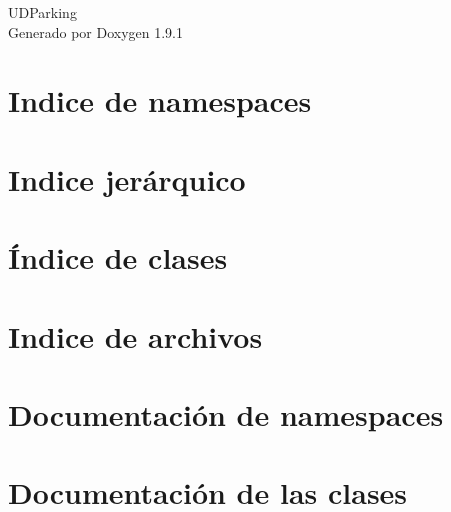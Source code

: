 \let\mypdfximage\pdfximage\def\pdfximage{\immediate\mypdfximage}\documentclass[twoside]{book}
\newcommand{\+}{\discretionary{\mbox{\scriptsize$\hookleftarrow$}}{}{}}
\newcommand{\clearemptydoublepage}{%
  \newpage{\pagestyle{empty}\cleardoublepage}%
}
\begin{document}
\raggedbottom

\begin{titlepage}
\vspace*{7cm}
\begin{center}%
{\Large UDParking }\\
\vspace*{1cm}
{\large Generado por Doxygen 1.9.1}\\
\end{center}
\end{titlepage}
\clearemptydoublepage
{}
\tableofcontents
\clearemptydoublepage
{}

\chapter{Indice de namespaces}

\chapter{Indice jerárquico}

\chapter{Índice de clases}

\chapter{Indice de archivos}

\chapter{Documentación de namespaces}





\chapter{Documentación de las clases}















\end{document}
